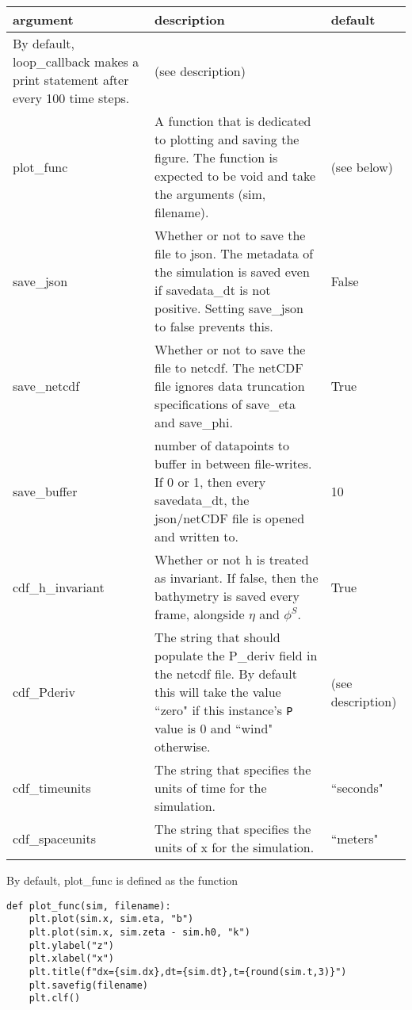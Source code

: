 \documentclass[10pt,a4paper]{article}
\newenvironment{optarglist}
    {\begin{center}
    \begin{tabular}{l|p{10cm}|l}
    argument & description & default\\
    \hline
    }
    { 
    \end{tabular} 
    \end{center}
    }
\begin{document}
\begin{optarglist}
                    By default, loop\_callback makes a print statement after
                    every 100 time steps. & (see description)\\\hline
        plot\_func &
                   A function that is dedicated to plotting and saving the
                    figure. The function is expected to be void and take the
                    arguments (sim, filename). & (see below)\\\hline
        save\_json &
                   Whether or not to save the file to json. The metadata of
                    the simulation is saved even if savedata\_dt is not
                    positive. Setting save\_json to false prevents this. & False\\\hline
        save\_netcdf&
                   Whether or not to save the file to netcdf. The netCDF file
                    ignores data truncation specifications of save\_eta and
                    save\_phi. & True \\\hline
        save\_buffer
                  & number of datapoints to buffer in between file-writes. If 0
                    or 1, then every savedata\_dt, the json/netCDF file is opened
                    and written to. & 10 \\\hline
        cdf\_h\_invariant
                  & Whether or not h is treated as invariant. If false, then
                    the bathymetry is saved every frame, alongside $\eta$ and
                    $\phi^S$. & True\\\hline
        cdf\_Pderiv
                  &The string that should populate the P\_deriv field in the
                    netcdf file. By default this will take the value ``zero" if this instance's \texttt{P} value is 0 and ``wind" otherwise. & (see description)\\\hline
        cdf\_timeunits
                  & The string that specifies the units of time for the
                    simulation. & ``seconds"\\\hline
        cdf\_spaceunits
                  & The string that specifies the units of x for the
                    simulation. & ``meters"
\end{optarglist}

By default, plot\_func is defined as the function

\begin{verbatim}
def plot_func(sim, filename):
    plt.plot(sim.x, sim.eta, "b")
    plt.plot(sim.x, sim.zeta - sim.h0, "k")
    plt.ylabel("z")
    plt.xlabel("x")
    plt.title(f"dx={sim.dx},dt={sim.dt},t={round(sim.t,3)}")
    plt.savefig(filename)
    plt.clf()
\end{verbatim}
\end{document}
